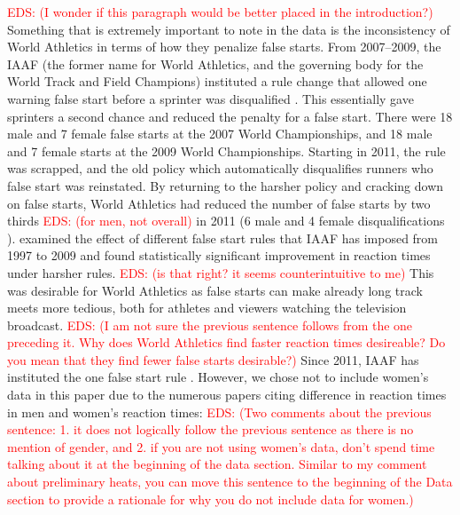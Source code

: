\documentclass[12pt, letterpaper, titlepage]{article}
\newcommand{\eds}[1]{\textcolor{red}{EDS: (#1)}}
\begin{document}
\eds{I wonder if this paragraph would be better placed in the introduction?}
Something that is extremely important to note in the data is the inconsistency 
of World Athletics in terms of how they penalize false starts.  From 2007--2009,
the IAAF (the former name for World Athletics, and the governing body for the 
World Track and Field Champions) instituted a rule change that allowed one 
warning false start before a sprinter was disqualified 
\citep{iaaf2009falsestart}.  This 
essentially gave sprinters a second chance and reduced the penalty for a false 
start.  There were 18 male and 7 female false starts at the 2007 World 
Championships, and 18 male and 7 female starts at the 2009 World Championships. 
Starting in 2011, the rule was scrapped, and the old policy which automatically 
disqualifies runners who false start was reinstated. By returning to the harsher 
policy and cracking down on false starts, World Athletics had reduced the number 
of false starts by two thirds \eds{for men, not overall} in 2011 (6 male and 4 female disqualifications 
\citep{iaaf2009falsestart}).
\citet{haugen2013effect} examined the effect of different false start
rules that IAAF has imposed from 1997 to 2009 and found statistically 
significant improvement in reaction times under harsher rules.
\eds{is that right?  it seems counterintuitive to me}
This was desirable for World Athletics as false starts can make already long 
track meets more tedious, both for athletes and viewers watching the 
television broadcast.  
\eds{I am not sure the previous sentence follows from the one preceding it. Why
 does World Athletics find faster reaction times desireable?  Do you mean that
they find fewer false starts desirable?}
Since 2011, IAAF has instituted the one false start rule
\citep{iaaf2009falsestart}. However, we chose not to include women's data in this
paper due to the numerous papers citing difference in reaction times in men and
women's reaction times: \citep{lipps2011implications, babicc2009reaction,
panoutsakopoulos2020gender}  \eds{Two comments about the previous sentence: 1. 
it does not logically follow the previous sentence as there is no mention of 
gender, and 2. if you are not using women's data, don't spend time talking about 
it at the beginning of the data section.  Similar to my comment about 
preliminary heats, you can move this sentence to the beginning of the Data 
section to provide a rationale for why you do not include data for women.} 
\end{document}
